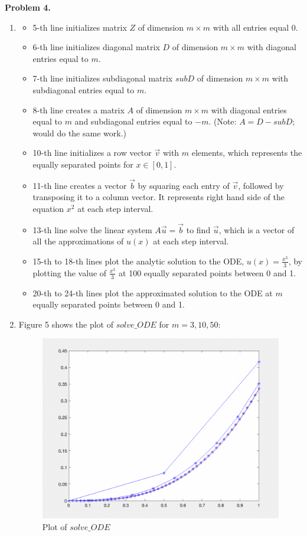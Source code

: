 \documentclass{article}
\begin{document}
\textbf{Problem 4.}
\begin{enumerate}[label=(\alph*)]
    \item 
    \begin{itemize}
        \item 5-th line initializes matrix $Z$ of dimension $m\times m$ with all entries equal 0.
        \item 6-th line initializes diagonal matrix $D$ of dimension $m\times m$ with diagonal entries equal to $m$.
        \item 7-th line initializes subdiagonal matrix $subD$ of dimension $m\times m$ with subdiagonal entries equal to $m$.
        \item 8-th line creates a matrix $A$ of dimension $m\times m$ with diagonal entries equal to $m$ and subdiagonal entries equal to $-m$. (Note: $A = D - subD;$ would do the same work.)
        \item 10-th line initializes a row vector $\vec{v}$ with $m$ elements, which represents the equally separated points for $x\in [0,1]$.
        \item 11-th line creates a vector $\vec{b}$ by squaring each entry of $\vec{v}$, followed by transposing it to a column vector. It represents right hand side of the equation $x^2$ at each step interval.
        \item 13-th line solve the linear system $A\vec{u}=\vec{b}$ to find $\vec{u}$, which is a vector of all the approximations of $u(x)$ at each step interval.
        \item 15-th to 18-th lines plot the analytic solution to the ODE, $u(x) = \frac{x^3}{3}$, by plotting the value of $\frac{x^3}{3}$ at 100 equally separated points between 0 and 1.
        \item 20-th to 24-th lines plot the approximated solution to the ODE at $m$ equally separated points between 0 and 1.
    \end{itemize}
    
    \item 
    Figure 5 shows the plot of $solve\_ODE$ for $m=3,10,50$:
    \begin{figure}[h!]
        \centering
        \includegraphics[scale = 0.5]{solve_ODE_plot.png}
        \caption{Plot of $solve\_ODE$}
    \end{figure}
    

\end{enumerate}
\end{document}
